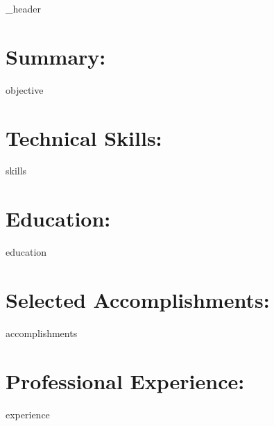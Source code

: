 \documentclass[letter,11pt]{article}
\author{Takasur Azeem} %
\begin{document}
{_header}

\section*{Summary:}
{objective}

\vspace{-0.55em}
\section*{Technical Skills:}
{skills}

\vspace{-0.45em}
\section*{Education:}
{education}

\vspace{-0.45em}
\section*{Selected Accomplishments:}
{accomplishments}

\vspace{-0.45em}
\section*{Professional Experience:}
{experience}
\end{document}
